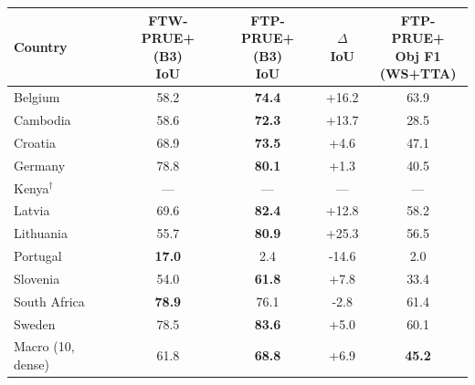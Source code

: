 \footnotesize
\setlength{\tabcolsep}{4pt}
\begin{tabular}{@{}l c c c c@{}}
\toprule
Country & \makecell{FTW-PRUE+\\(B3)\\IoU} & \makecell{FTP-PRUE+\\(B3)\\IoU} & \makecell{$\Delta$\\IoU} & \makecell{FTP-PRUE+\\Obj F1\\(WS+TTA)} \\
\midrule
Belgium & 58.2 & \textbf{74.4} & +16.2 & 63.9 \\
Cambodia & 58.6 & \textbf{72.3} & +13.7 & 28.5 \\
Croatia & 68.9 & \textbf{73.5} & +4.6 & 47.1 \\
Germany & 78.8 & \textbf{80.1} & +1.3 & 40.5 \\
Kenya$^{\dagger}$ & --- & --- & --- & --- \\
Latvia & 69.6 & \textbf{82.4} & +12.8 & 58.2 \\
Lithuania & 55.7 & \textbf{80.9} & +25.3 & 56.5 \\
Portugal & \textbf{17.0} & 2.4 & -14.6 & 2.0 \\
Slovenia & 54.0 & \textbf{61.8} & +7.8 & 33.4 \\
South Africa & \textbf{78.9} & 76.1 & -2.8 & 61.4 \\
Sweden & 78.5 & \textbf{83.6} & +5.0 & 60.1 \\
\midrule
Macro (10, dense) & 61.8 & \textbf{68.8} & +6.9 & \textbf{45.2} \\
\bottomrule
\end{tabular}

\vspace{2pt}

